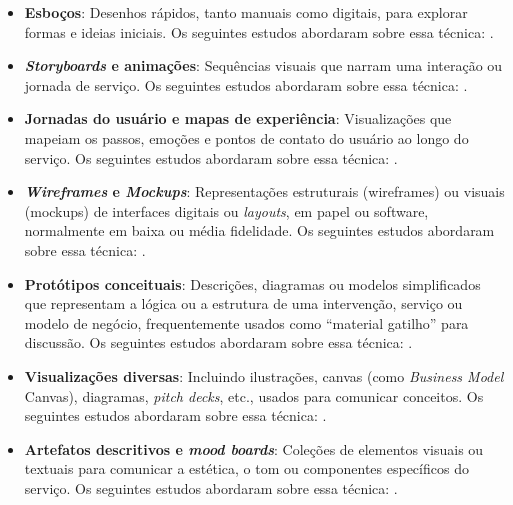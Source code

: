 \begin{itemize}
	\item \textbf{Esboços}: Desenhos rápidos, tanto manuais como digitais, para explorar formas e ideias iniciais. Os seguintes estudos abordaram sobre essa técnica: .
	
	\item \textbf{\textit{Storyboards} e animações}: Sequências visuais que narram uma interação ou jornada de serviço. Os seguintes estudos abordaram sobre essa técnica: .
	
	\item \textbf{Jornadas do usuário e mapas de experiência}: Visualizações que mapeiam os passos, emoções e pontos de contato do usuário ao longo do serviço. Os seguintes estudos abordaram sobre essa técnica: .
	
	\item \textbf{\textit{Wireframes} e \textit{Mockups}}: Representações estruturais (wireframes) ou visuais (mockups) de interfaces digitais ou \textit{layouts}, em papel ou software, normalmente em baixa ou média fidelidade. Os seguintes estudos abordaram sobre essa técnica: .
	
	\item \textbf{Protótipos conceituais}: Descrições, diagramas ou modelos simplificados que representam a lógica ou a estrutura de uma intervenção, serviço ou modelo de negócio, frequentemente usados como ``material gatilho'' para discussão. Os seguintes estudos abordaram sobre essa técnica: .
	
	\item \textbf{Visualizações diversas}: Incluindo ilustrações, canvas (como \textit{Business Model} Canvas), diagramas, \textit{pitch decks}, etc., usados para comunicar conceitos. Os seguintes estudos abordaram sobre essa técnica: .
	
	\item \textbf{Artefatos descritivos e \textit{mood boards}}: Coleções de elementos visuais ou textuais para comunicar a estética, o tom ou componentes específicos do serviço. Os seguintes estudos abordaram sobre essa técnica: .
\end{itemize}

